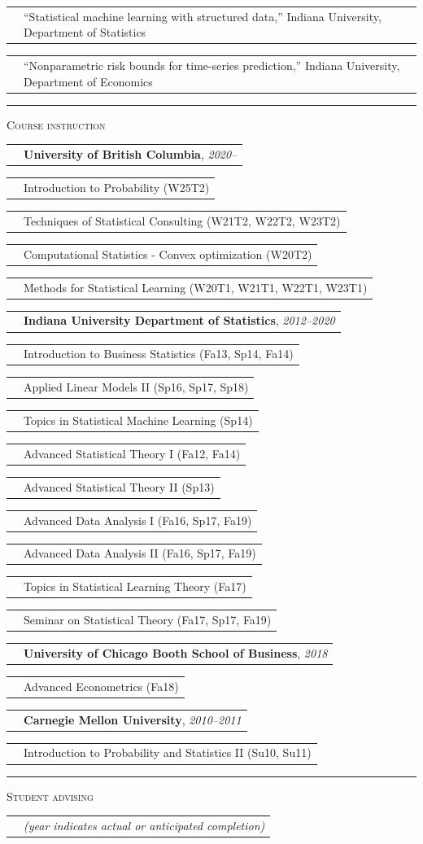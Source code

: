 \documentclass[11pt,letterpaper]{minimal/moderncv}
\makeatletter
\renewcommand{\section}[1]{  \par\addvspace{15pt}%
  \parbox[t]{\hintscolumnwidth}{\strut\raggedleft\raisebox{4pt}%
  {\rule{\hintscolumnwidth}{2pt}}}%
  \hspace{\separatorcolumnwidth}%
  \textsc{\Large #1}\par\nobreak\addvspace{6pt}%
}
\renewcommand*{\cvitem}[2]{%
  \begin{tabular}{@{}p{\hintscolumnwidth}@{\hspace{\separatorcolumnwidth}}%
    p{\maincolumnwidth}@{}}%
    \raggedleft {#1} &  {#2}%
  \end{tabular}%
}
\makeatother
\begin{document}
\cvitem{2014}{ ``Statistical machine learning with structured data,''
  Indiana University, Department of Statistics}

\cvitem{2012}{ ``Nonparametric risk bounds for time-series prediction,''
  Indiana University, Department of Economics}





\section{Course instruction}

\vspace{6pt}
\cvitem{}{\textbf{University of British Columbia}, \emph{2020--}}
\cvitem{Stat 302}{Introduction to Probability (W25T2)}
\cvitem{Stat 550}{Techniques of Statistical Consulting (W21T2, W22T2, W23T2)}
\cvitem{Stat 535a}{Computational Statistics - Convex optimization (W20T2)}
\cvitem{Stat 406}{Methods for Statistical Learning (W20T1, W21T1, W22T1, W23T1)}

\vspace{6pt}
\cvitem{}{\textbf{Indiana University Department of Statistics},
  \emph{2012--2020}}
\cvitem{S301}{Introduction to Business Statistics (Fa13, Sp14, Fa14)}
\cvitem{S432}{Applied Linear Models II (Sp16, Sp17, Sp18)}
\cvitem{S682}{Topics in Statistical Machine Learning (Sp14)}
\cvitem{S721}{Advanced Statistical Theory I (Fa12, Fa14)}
\cvitem{S722}{Advanced Statistical Theory II (Sp13)}
\cvitem{S771}{Advanced Data Analysis I (Fa16, Sp17, Fa19)}
\cvitem{S772}{Advanced Data Analysis II (Fa16, Sp17, Fa19)}
\cvitem{S782}{Topics in Statistical Learning Theory (Fa17)}
\cvitem{S785}{Seminar on Statistical Theory (Fa17, Sp17, Fa19)}

\vspace{6pt}
\cvitem{}{\textbf{University of Chicago Booth School of Business},
  \emph{2018}}
\cvitem{41911}{Advanced Econometrics (Fa18)}

\vspace{6pt}
\cvitem{}{\textbf{Carnegie Mellon University}, \emph{2010--2011}}
\cvitem{36--226}{Introduction to Probability and Statistics II (Su10,
  Su11)}



\section{Student advising}
\vspace*{-8pt}
\cvitem{}{\emph{\small (year indicates actual or anticipated completion)}}
\vspace{0pt}
\end{document}
